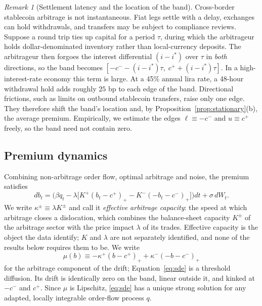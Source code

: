 \documentclass[12pt]{article}
\theoremstyle{definition}
\theoremstyle{remark}
\newtheorem{remark}{Remark}
\newcommand{\pos}[1]{\left(#1\right)_+}
\begin{document}
\begin{remark}[Settlement latency and the location of the band]\label{rem:carry}
Cross-border stablecoin arbitrage is not instantaneous. Fiat legs settle with a delay, exchanges can hold withdrawals, and transfers may be subject to compliance reviews. Suppose a round trip ties up capital for a period $\tau$, during which the arbitrageur holds dollar-denominated inventory rather than local-currency deposits. The arbitrageur then forgoes the interest differential $(i-i^*)$ over $\tau$ in \emph{both} directions, so the band becomes $[-c^- - (i-i^*)\tau,\; c^+ + (i-i^*)\tau]$. In a high-interest-rate economy this term is large. At a 45\% annual lira rate, a 48-hour withdrawal hold adds roughly $25$ bp to each edge of the band. Directional frictions, such as limits on outbound stablecoin transfers, raise only one edge. They therefore shift the band's location and, by Proposition~\ref{prop:stationary}(b), the average premium. Empirically, we estimate the edges $\ell\equiv-c^-$ and $u\equiv c^+$ freely, so the band need not contain zero.
\end{remark}

\subsection{Premium dynamics}

Combining non-arbitrage order flow, optimal arbitrage and noise, the premium satisfies
\begin{equation}\label{eq:sde}
db_t = \Big(\beta q_t - \lambda\big[K^+\pos{b_t-c^+} - K^-\pos{-b_t-c^-}\big]\Big)dt + \sigma\,dW_t .
\end{equation}
We write $\kappa^\pm\equiv\lambda K^\pm$ and call it \emph{effective arbitrage capacity}: the speed at which arbitrage closes a dislocation, which combines the balance-sheet capacity $K^\pm$ of the arbitrage sector with the price impact $\lambda$ of its trades. Effective capacity is the object the data identify; $K$ and $\lambda$ are not separately identified, and none of the results below requires them to be. We write
\[
\mu(b) \equiv -\kappa^+\pos{b-c^+} + \kappa^-\pos{-b-c^-}
\]
for the arbitrage component of the drift; Equation~\eqref{eq:sde} is a threshold diffusion. Its drift is identically zero on the band, linear outside it, and kinked at $-c^-$ and $c^+$. Since $\mu$ is Lipschitz, \eqref{eq:sde} has a unique strong solution for any adapted, locally integrable order-flow process $q$.

\end{document}

